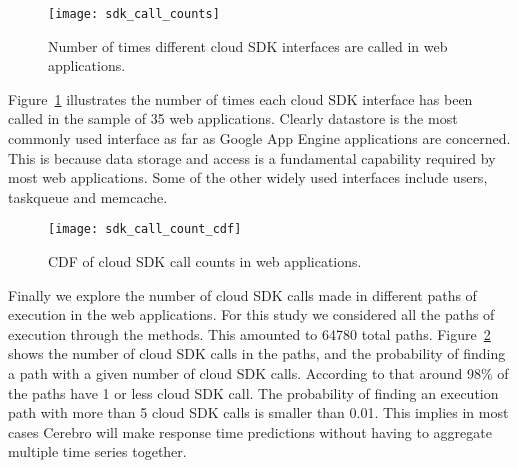 \begin{figure}
\centering
\texttt{[image: sdk\_call\_counts]}
\caption{Number of times different cloud SDK interfaces are called in web applications.}
\label{fig:sdk_call_counts}
\end{figure}

Figure~\ref{fig:sdk_call_counts} illustrates the number of times each cloud SDK interface has been called in the sample of
35 web applications. Clearly datastore is the most commonly used interface as far as Google App Engine applications are 
concerned. This is because data storage and access is a fundamental capability required by most web applications. 
Some of the other widely used interfaces include users, taskqueue and memcache. 

\begin{figure}
\centering
\texttt{[image: sdk\_call\_count\_cdf]}
\caption{CDF of cloud SDK call counts in web applications.}
\label{fig:sdk_call_count_cdf}
\end{figure}

Finally we explore the number of cloud SDK calls made in different paths of execution in the web applications. For this study
we considered all the paths of execution through the methods. This amounted to 64780 total paths. Figure~\ref{fig:sdk_call_count_cdf}
shows the number of cloud SDK calls in the paths, and the probability of finding a path with a given number of cloud SDK calls.
According to that around 98\% of the paths have 1 or less cloud SDK call. The probability of finding an execution path with more than
5 cloud SDK calls is smaller than 0.01. This implies in most cases Cerebro will make response time predictions without having to 
aggregate multiple time series together.